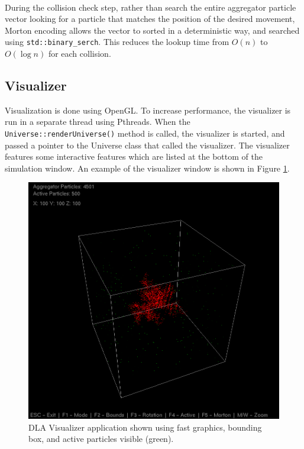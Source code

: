 \documentclass[fleqn,10pt]{UserGuideArx} %
\begin{document}
~\\
During the collision check step, rather than search the entire aggregator particle vector looking for a particle that matches the position of the desired movement, Morton encoding allows the vector to sorted in a deterministic way, and searched using \texttt{std\allowbreak::binary\_serch}. This reduces the lookup time from $O(n)$ to $O(\log n)$ for each collision.\\

\subsection{Visualizer}
Visualization is done using OpenGL. To increase performance, the visualizer is run in a separate thread using Pthreads. When the \texttt{Universe\allowbreak::renderUniverse()} method is called, the visualizer is started, and passed a pointer to the Universe class that called the visualizer. The visualizer features some interactive features which are listed at the bottom of the simulation window. An example of the visualizer window is shown in Figure \ref{fig:DLAAPP}.
\begin{figure}[!h]\centering %
    \includegraphics[width=\linewidth]{images/DLAVisualizer.png}
    \caption{DLA Visualizer application shown using fast graphics, bounding box, and active particles visible (green).}
    \label{fig:DLAAPP}
    \end{figure}
\end{document}
